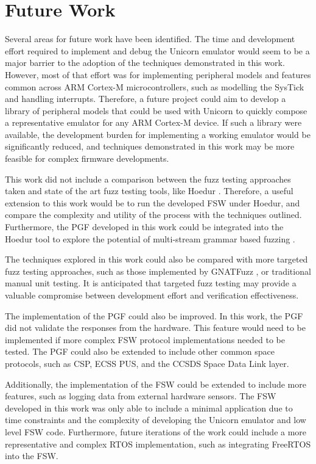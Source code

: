 \documentclass[../report.tex]{subfiles}
\begin{document}
\section{Future Work}

Several areas for future work have been identified. The time and development
effort required to implement and debug the Unicorn emulator would seem to be a
major barrier to the adoption of the techniques demonstrated in this work.
However, most of that effort was for implementing peripheral models and
features common across ARM Cortex-M microcontrollers, such as modelling the
SysTick and handling interrupts. Therefore, a future project could aim to
develop a library of peripheral models that could be used with Unicorn to
quickly compose a representative emulator for any ARM Cortex-M device. If such
a library were available, the development burden for implementing a working
emulator would be significantly reduced, and techniques demonstrated in this
work may be more feasible for complex firmware developments.

This work did not include a comparison between the fuzz testing approaches
taken and state of the art fuzz testing tools, like Hoedur \citep{Hoedur_2023}.
Therefore, a useful extension to this work would be to run the developed FSW
under Hoedur, and compare the complexity and utility of the process with the
techniques outlined. Furthermore, the PGF developed in this work could be
integrated into the Hoedur tool to explore the potential of multi-stream
grammar based fuzzing \citep{Hoedur_2023}.

The techniques explored in this work could also be compared with more targeted
fuzz testing approaches, such as those implemented by GNATFuzz \citep{gnatfuzz},
or traditional manual unit testing. It is anticipated that targeted fuzz
testing may provide a valuable compromise between development effort and
verification effectiveness.

The implementation of the PGF could also be improved. In this work, the PGF did
not validate the responses from the hardware. This feature would need to be
implemented if more complex FSW protocol implementations needed to be tested.
The PGF could also be extended to include other common space protocols, such as
CSP, ECSS PUS, and the CCSDS Space Data Link layer.

Additionally, the implementation of the FSW could be extended to include more
features, such as logging data from external hardware sensors. The FSW developed in
this work was only able to include a minimal application due to time
constraints and the complexity of developing the Unicorn emulator and low level
FSW code. Furthermore, future iterations of the work could include a more
representative and complex RTOS implementation, such as integrating FreeRTOS
into the FSW.
\end{document}
